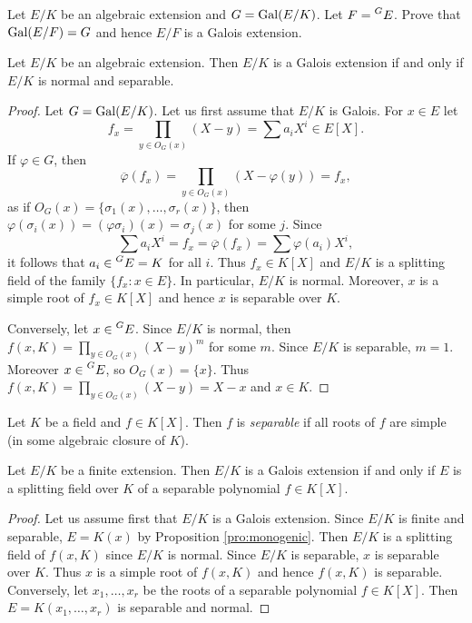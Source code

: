 \begin{exercise}
    Let $E/K$ be an algebraic extension and $G=\operatorname{Gal}(E/K)$. Let
    $F=\prescript{G}{}{E}$. Prove that $\operatorname{Gal}(E/F)=G$ and hence $E/F$ is a Galois extension. 
\end{exercise}

\begin{proposition}
\label{pro:normal+separable}
    Let $E/K$ be an algebraic extension. Then $E/K$ is a Galois extension
    if and only if $E/K$ is normal and separable. 
\end{proposition}

\begin{proof}
    Let $G=\operatorname{Gal}(E/K)$. Let us first assume that $E/K$ is Galois. For $x\in E$ let 
    \[
    f_x=\prod_{y\in O_G(x)}(X-y)=\sum a_iX^i\in E[X].
    \]
    If $\varphi\in G$, then 
    \[
    \overline{\varphi}(f_x)=\prod_{y\in O_G(x)}(X-\varphi(y))=f_x,
    \]
    as if $O_G(x)=\{\sigma_1(x),\dots,\sigma_r(x)\}$, then 
    $\varphi(\sigma_i(x))=(\varphi\sigma_i)(x)=\sigma_j(x)$ for some $j$. 
    Since 
    \[
    \sum a_iX^i=f_x=\overline{\varphi}(f_x)=\sum\varphi(a_i)X^i,
    \]
    it follows that $a_i\in\prescript{G}{}{E}=K$ for all $i$. 
    Thus $f_x\in K[X]$
    and $E/K$ is a splitting field of the family $\{f_x:x\in E\}$. In particular, 
    $E/K$ is normal. Moreover, $x$ is a simple root of $f_x\in K[X]$ and hence
    $x$ is separable over $K$. 

    Conversely, let $x\in \prescript{G}{}{E}$. Since $E/K$ is normal, then 
    $f(x,K)=\prod_{y\in O_G(x)}(X-y)^m$ for some $m$.
    Since $E/K$ is separable, 
    $m=1$.
    Moreover $x\in \prescript{G}{}{E}$, so $O_G(x)=\{x\}$.
    Thus $f(x,K)=\prod_{y\in O_G(x)}(X-y)=X-x$ and $x\in K$. 
\end{proof}

\begin{definition}
Let $K$ be a field and $f\in K[X]$. Then $f$ is \emph{separable}
if all roots of $f$ are simple (in some algebraic closure of $K$). 
\end{definition}

\begin{proposition}
    Let $E/K$ be a finite extension. Then $E/K$ is a Galois extension 
    if and only if $E$ is a splitting field over $K$ 
    of a separable polynomial $f\in K[X]$. 
\end{proposition}

\begin{proof}
    Let us assume first that $E/K$ is a Galois extension. Since
    $E/K$ is finite and separable, $E=K(x)$ by Proposition \ref{pro:monogenic}. 
    Then $E/K$ is a splitting field of $f(x,K)$ since
    $E/K$ is normal. Since $E/K$ is separable, $x$ is separable over $K$. Thus $x$ is 
    a simple root of $f(x,K)$ and hence $f(x,K)$ is separable. 
    Conversely, let $x_1,\dots,x_r$ be the roots of a separable polynomial $f\in K[X]$.
    Then $E=K(x_1,\dots,x_r)$ is separable and normal.  
\end{proof}

